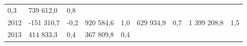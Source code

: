 \begin{longtable}[]{@{}lllllllll@{}}
\begin{minipage}[t]{0.06\columnwidth}
0,3\strut
\end{minipage} & \begin{minipage}[t]{0.10\columnwidth}\raggedright
739 612,0\strut
\end{minipage} & \begin{minipage}[t]{0.06\columnwidth}\raggedright
0,8\strut
\end{minipage}\tabularnewline
\begin{minipage}[t]{0.05\columnwidth}\raggedright
2012\strut
\end{minipage} & \begin{minipage}[t]{0.10\columnwidth}\raggedright
-151 310,7\strut
\end{minipage} & \begin{minipage}[t]{0.06\columnwidth}\raggedright
-0,2\strut
\end{minipage} & \begin{minipage}[t]{0.16\columnwidth}\raggedright
920 584,6\strut
\end{minipage} & \begin{minipage}[t]{0.06\columnwidth}\raggedright
1,0\strut
\end{minipage} & \begin{minipage}[t]{0.12\columnwidth}\raggedright
629 934,9\strut
\end{minipage} & \begin{minipage}[t]{0.06\columnwidth}\raggedright
0,7\strut
\end{minipage} & \begin{minipage}[t]{0.10\columnwidth}\raggedright
1 399 208,8\strut
\end{minipage} & \begin{minipage}[t]{0.06\columnwidth}\raggedright
1,5\strut
\end{minipage}\tabularnewline
\begin{minipage}[t]{0.05\columnwidth}\raggedright
2013\strut
\end{minipage} & \begin{minipage}[t]{0.10\columnwidth}\raggedright
414 833,3\strut
\end{minipage} & \begin{minipage}[t]{0.06\columnwidth}\raggedright
0,4\strut
\end{minipage} & \begin{minipage}[t]{0.16\columnwidth}\raggedright
367 809,8\strut
\end{minipage} & \begin{minipage}[t]{0.06\columnwidth}\raggedright
0,4\strut
\end{minipage} & \begin{minipage}[t]{0.12\columnwidth}\raggedright

\end{minipage}
\end{longtable}
